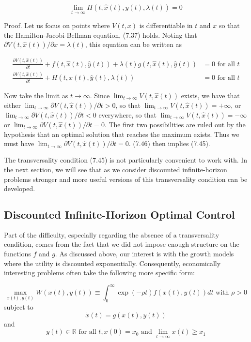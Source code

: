 \documentclass[\topdir/lecture_notes.tex]{subfiles}
\begin{document}
\[
\lim _{t \rightarrow \infty} H(t, \hat{x}(t), \hat{y}(t), \lambda(t))=0
\]

Proof. Let us focus on points where $V(t, x)$ is differentiable in $t$ and $x$ so that the Hamilton-Jacobi-Bellman equation, (7.37) holds. Noting that $\partial V(t, \hat{x}(t)) / \partial x=\lambda(t)$, this equation can be written as

\[
\begin{aligned}
\frac{\partial V(t, \hat{x}(t))}{\partial t}+f(t, \hat{x}(t), \hat{y}(t))+\lambda(t) g(t, \hat{x}(t), \hat{y}(t)) & =0 \text { for all } t \\
\frac{\partial V(t, \hat{x}(t))}{\partial t}+H(t, \hat{x}(t), \hat{y}(t), \lambda(t)) & =0 \text { for all } t
\end{aligned}
\]

Now take the limit as $t \rightarrow \infty$. Since $\lim _{t \rightarrow \infty} V(t, \hat{x}(t))$ exists, we have that either $\lim _{t \rightarrow \infty} \partial V(t, \hat{x}(t)) / \partial t>0$, so that $\lim _{t \rightarrow \infty} V(t, \hat{x}(t))=+\infty$, or $\lim _{t \rightarrow \infty} \partial V(t, \hat{x}(t)) / \partial t<0$ everywhere, so that $\lim _{t \rightarrow \infty} V(t, \hat{x}(t))=-\infty$ or $\lim _{t \rightarrow \infty} \partial V(t, \hat{x}(t)) / \partial t=0$. The first two possibilities are ruled out by the hypothesis that an optimal solution that reaches the maximum exists. Thus we must have $\lim _{t \rightarrow \infty} \partial V(t, \hat{x}(t)) / \partial t=0$. (7.46) then implies (7.45).

The transversality condition (7.45) is not particularly convenient to work with. In the next section, we will see that as we consider discounted infinite-horizon problems stronger and more useful versions of this transversality condition can be developed.

\subsection{Discounted Infinite-Horizon Optimal Control}
Part of the difficulty, especially regarding the absence of a transversality condition, comes from the fact that we did not impose enough structure on the functions $f$ and $g$. As discussed above, our interest is with the growth models where the utility is discounted exponentially. Consequently, economically interesting problems often take the following more specific form:

\[
\max _{x(t), y(t)} W(x(t), y(t)) \equiv \int_{0}^{\infty} \exp (-\rho t) f(x(t), y(t)) d t \text { with } \rho>0
\]
subject to
\[
\dot{x}(t)=g(x(t), y(t))
\]
and
\[
y(t) \in \mathbb{R} \text { for all } t, x(0)=x_{0} \text { and } \lim _{t \rightarrow \infty} x(t) \geq x_{1}
\]
\end{document}
